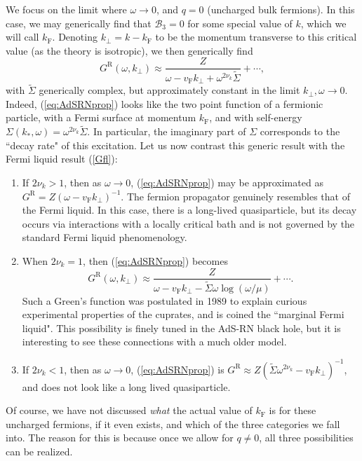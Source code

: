 \documentclass[10pt, oneside]{book}
\begin{document}
\begin{doublespace}
We focus on the limit where $\omega \rightarrow 0$, and $q=0$ (uncharged bulk fermions).   In this case, we may generically find that $\mathcal{B}_3=0$ for some special value of $k$,  which we will call $k_{\mathrm{F}}$.   Denoting $k_\perp=k-k_{\mathrm{F}}$ to be the momentum transverse to this critical value (as the theory is isotropic), we then generically find \begin{equation}
G^{\mathrm{R}}(\omega,k_\perp) \approx \frac{Z}{\omega - v_{\mathrm{F}} k_\perp + \omega^{2\nu_k}\tilde\Sigma}+\cdots,   \label{eq:AdSRNprop}
\end{equation}
with $\tilde\Sigma$ generically complex, but approximately constant in the limit $k_\perp,\omega\rightarrow 0$.  Indeed, (\ref{eq:AdSRNprop}) looks like the two point function of a fermionic particle, with a Fermi surface at momentum $k_{\mathrm{F}}$, and with self-energy $\Sigma(k_*,\omega)=\omega^{2\nu_k} \tilde \Sigma$.  In particular, the imaginary part of $\Sigma$ corresponds to the ``decay rate" of this excitation.    Let us now contrast this generic result with the Fermi liquid result (\ref{Gfl}):
\begin{enumerate}
\item  If $2\nu_k >1$,  then as $\omega \rightarrow 0$, (\ref{eq:AdSRNprop}) may be approximated as $G^{\mathrm{R}} = Z(\omega-v_{\mathrm{F}}k_\perp)^{-1}$.     The fermion propagator genuinely resembles that of the Fermi liquid.   In this case,  there is a long-lived quasiparticle, but its decay occurs via interactions with a locally critical bath and is not governed by the standard Fermi liquid phenomenology.
\item When $2\nu_k=1$, then (\ref{eq:AdSRNprop}) becomes \begin{equation}
G^{\mathrm{R}}(\omega,k_\perp)  \approx \frac{Z}{\omega - v_{\mathrm{F}}k_\perp - \tilde\Sigma \omega \log (\omega/\mu)} + \cdots.
\end{equation}
Such a Green's function was postulated in 1989 \cite{varma} to explain curious experimental properties of the cuprates, and is coined the ``marginal Fermi liquid".  This possibility is finely tuned in the AdS-RN black hole, but it is interesting to see these connections with a much older model.
\item If $2\nu_k <1$, then as $\omega \rightarrow 0$,  (\ref{eq:AdSRNprop}) is $G^{\mathrm{R}}\approx Z(\tilde\Sigma \omega^{2\nu_k} - v_{\mathrm{F}}k_\perp)^{-1}$,  and does not look like a long lived quasiparticle.
\end{enumerate}
Of course, we have not discussed \emph{what} the actual value of $k_{\mathrm{F}}$ is for these uncharged fermions, if it even exists, and which of the three categories we fall into.  The reason for this is because once we allow for $q\ne 0$,  all three possibilities can be realized.   


\end{doublespace}
\end{document}
